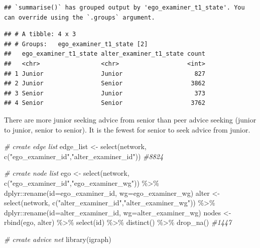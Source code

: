 \documentclass[
]{article}
\newenvironment{Shaded}{\begin{snugshade}}{\end{snugshade}}
\newcommand{\AttributeTok}[1]{\textcolor[rgb]{0.77,0.63,0.00}{#1}}
\newcommand{\CommentTok}[1]{\textcolor[rgb]{0.56,0.35,0.01}{\textit{#1}}}
\newcommand{\FunctionTok}[1]{\textcolor[rgb]{0.00,0.00,0.00}{#1}}
\newcommand{\NormalTok}[1]{#1}
\newcommand{\OtherTok}[1]{\textcolor[rgb]{0.56,0.35,0.01}{#1}}
\newcommand{\SpecialCharTok}[1]{\textcolor[rgb]{0.00,0.00,0.00}{#1}}
\newcommand{\StringTok}[1]{\textcolor[rgb]{0.31,0.60,0.02}{#1}}
\begin{document}
\begin{verbatim}
## `summarise()` has grouped output by 'ego_examiner_t1_state'. You can override using the `.groups` argument.
\end{verbatim}

\begin{verbatim}
## # A tibble: 4 x 3
## # Groups:   ego_examiner_t1_state [2]
##   ego_examiner_t1_state alter_examiner_t1_state count
##   <chr>                 <chr>                   <int>
## 1 Junior                Junior                    827
## 2 Junior                Senior                   3862
## 3 Senior                Junior                    373
## 4 Senior                Senior                   3762
\end{verbatim}

There are more junior seeking advice from senior than peer advice
seeking (junior to junior, senior to senior). It is the fewest for
senior to seek advice from junior.

\begin{Shaded}
\begin{Highlighting}[]
\CommentTok{\# create edge list}
\NormalTok{edge\_list }\OtherTok{\textless{}{-}} \FunctionTok{select}\NormalTok{(network, }\FunctionTok{c}\NormalTok{(}\StringTok{"ego\_examiner\_id"}\NormalTok{,}\StringTok{"alter\_examiner\_id"}\NormalTok{)) }\CommentTok{\#8824}

\CommentTok{\# create node list}
\NormalTok{ego }\OtherTok{\textless{}{-}} \FunctionTok{select}\NormalTok{(network, }\FunctionTok{c}\NormalTok{(}\StringTok{"ego\_examiner\_id"}\NormalTok{,}\StringTok{"ego\_examiner\_wg"}\NormalTok{)) }\SpecialCharTok{\%\textgreater{}\%}
\NormalTok{    dplyr}\SpecialCharTok{::}\FunctionTok{rename}\NormalTok{(}\AttributeTok{id=}\NormalTok{ego\_examiner\_id, }\AttributeTok{wg=}\NormalTok{ego\_examiner\_wg)}
\NormalTok{alter }\OtherTok{\textless{}{-}} \FunctionTok{select}\NormalTok{(network, }\FunctionTok{c}\NormalTok{(}\StringTok{"alter\_examiner\_id"}\NormalTok{,}\StringTok{"alter\_examiner\_wg"}\NormalTok{)) }\SpecialCharTok{\%\textgreater{}\%}
\NormalTok{    dplyr}\SpecialCharTok{::}\FunctionTok{rename}\NormalTok{(}\AttributeTok{id=}\NormalTok{alter\_examiner\_id, }\AttributeTok{wg=}\NormalTok{alter\_examiner\_wg)}
\NormalTok{nodes }\OtherTok{\textless{}{-}} \FunctionTok{rbind}\NormalTok{(ego, alter) }\SpecialCharTok{\%\textgreater{}\%}
  \FunctionTok{select}\NormalTok{(id) }\SpecialCharTok{\%\textgreater{}\%}
  \FunctionTok{distinct}\NormalTok{() }\SpecialCharTok{\%\textgreater{}\%}
  \FunctionTok{drop\_na}\NormalTok{() }\CommentTok{\#1447}

\CommentTok{\# create advice net}
\FunctionTok{library}\NormalTok{(igraph)}
\end{Highlighting}
\end{Shaded}
\end{document}
